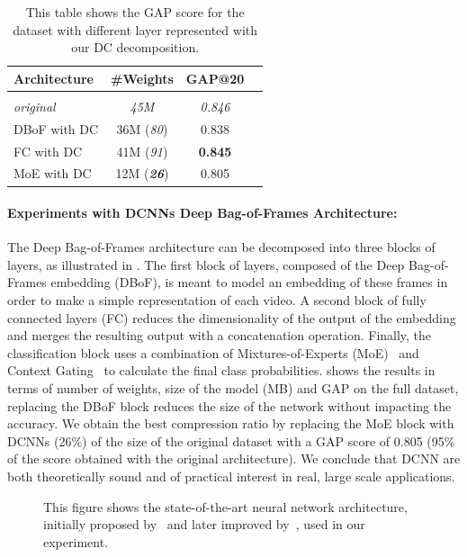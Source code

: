 \begin{table}
  \centering
  \caption{This table shows the GAP score for the \yt dataset with different layer represented with our DC decomposition.}
  \begin{tabular}{lccc}
  \toprule
  \textbf{Architecture} & \textbf{\#Weights} & \textbf{GAP@20} \\
  \hline \\
  \textit{original} & \textit{45M} & \textit{0.846} \\
  DBoF with DC   & 36M (\textit{80}) & 0.838 \\
  FC with DC    & 41M (\textit{91}) & \textbf{0.845} \\
  MoE with DC   & 12M (\textit{\textbf{26}}) & 0.805 \\
  \hline
  \end{tabular}
  \label{table:youtube_full_xp}
\end{table}

\paragraph{Experiments with DCNNs Deep Bag-of-Frames Architecture:}
The Deep Bag-of-Frames architecture can be decomposed into three blocks of layers, as illustrated in .
The first block of layers, composed of the Deep Bag-of-Frames embedding (DBoF), is meant to model an embedding of these frames in order to make a simple representation of each video.
A second block of fully connected layers (FC) reduces the dimensionality of the output of the embedding and merges the resulting output with a concatenation operation.
Finally, the classification block uses a combination of Mixtures-of-Experts (MoE)~\cite{jordan1993hierarchical,abu2016youtube} and Context Gating~\cite{miech2017learnable} to calculate the final class probabilities.
 shows the results in terms of number of weights, size of the model (MB) and GAP on the full dataset, replacing the DBoF block reduces the size of the network without impacting the accuracy.
We obtain the best compression ratio by replacing the MoE block with DCNNs (26\%) of the size of the original dataset with a GAP score of 0.805 (95\% of the score obtained with the original architecture).
We conclude that DCNN are both theoretically sound and of practical interest in real, large scale applications.

\begin{figure}[htb]
  \centering
  
  \caption{This figure shows the state-of-the-art neural network architecture, initially proposed by~\citet{abu2016youtube} and later improved by~\citet{miech2017learnable}, used in our experiment.}
  \label{figure:ch4-archi_youtube}
\end{figure}

